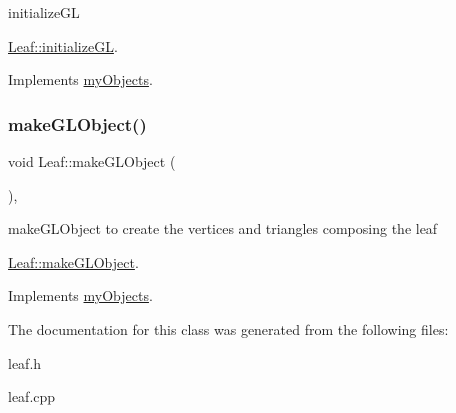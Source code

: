initialize\+GL 

\hyperlink{classLeaf_a5c0c2ea2fdb32a5b2f8c91982d987f65}{Leaf\+::initialize\+GL}. 

Implements \hyperlink{classmyObjects_a9b5dc2668a3fab5c74fd07e2145f6293}{my\+Objects}.

\mbox{\label{classLeaf_ac3d35271ec658ca78ca83e5bf81c20d1}} 
\subsubsection{\texorpdfstring{make\+G\+L\+Object()}{makeGLObject()}}
{\footnotesize\ttfamily void Leaf\+::make\+G\+L\+Object (\begin{DoxyParamCaption}{ }\end{DoxyParamCaption})\hspace{0.3cm}{\ttfamily [override]}, {\ttfamily [virtual]}}



make\+G\+L\+Object to create the vertices and triangles composing the leaf 

\hyperlink{classLeaf_ac3d35271ec658ca78ca83e5bf81c20d1}{Leaf\+::make\+G\+L\+Object}. 

Implements \hyperlink{classmyObjects_aeab77bc0741eeba1240ff68218769d16}{my\+Objects}.



The documentation for this class was generated from the following files\+:\begin{DoxyCompactItemize}
\item 
leaf.\+h\item 
leaf.\+cpp\end{DoxyCompactItemize}
